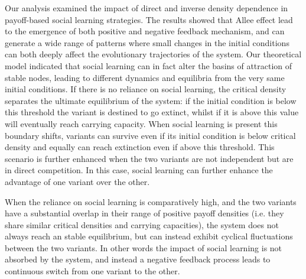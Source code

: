 \documentclass[review,authoryear]{elsarticle}
\begin{document}
Our analysis examined the impact of direct and inverse density dependence in payoff-based social learning strategies. The results showed that Allee effect lead to the emergence of both positive and negative feedback mechanism, and can generate a wide range of patterns where small changes in the initial conditions can both deeply affect the evolutionary trajectories of the system. Our theoretical model indicated that social learning can in fact alter the basins of attraction of stable nodes, leading to different dynamics and equilibria from the very same initial conditions. If there is no reliance on social learning, the critical density separates the ultimate equilibrium of the system: if the initial condition is below this threshold the variant is destined to go extinct, whilst if it is above this value will eventually reach carrying capacity. When social learning is present this boundary shifts, variants can survive even if its initial condition is below critical density and equally can reach extinction even if above this threshold. This scenario is further enhanced when the two variants are not independent but are in direct competition. In this case, social learning can further enhance the advantage of one variant over the other. 

When the reliance on social learning is comparatively high, and the two variants have a substantial overlap in their range of positive payoff densities (i.e. they share similar critical densities and carrying capacities), the system does not always reach an stable equilibrium, but can instead exhibit cyclical fluctuations between the two variants. In other words the impact of social learning is not absorbed by the system, and instead a negative feedback process leads to continuous switch from one variant to the other. 
\end{document}
